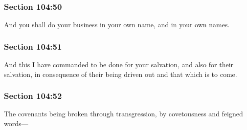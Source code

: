 	\subsubsection{Section 104:50} %
		\label{DC104-50}

		And you shall do your business in your own name, and in your own names.


	\subsubsection{Section 104:51} %
		\label{DC104-51}

		And this I have commanded to be done for your salvation, and also for their salvation, in consequence of their being driven out and that which is to come.


	\subsubsection{Section 104:52} %
		\label{DC104-52}

		The covenants being broken through transgression, by covetousness and feigned words---


